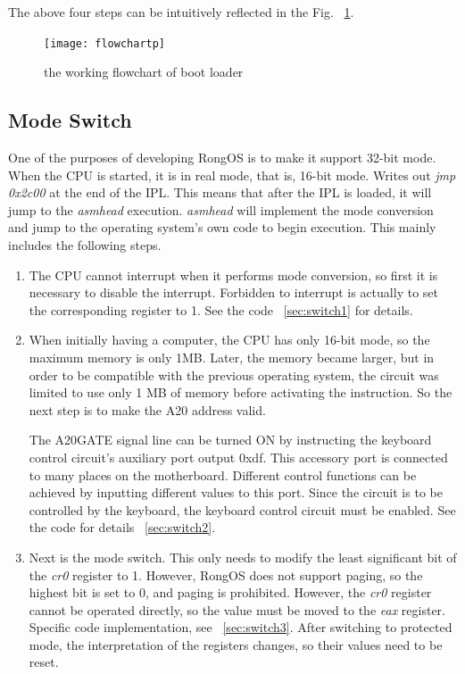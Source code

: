 \documentclass{swfcthesis}
\begin{document}
The above four steps can be intuitively reflected in the Fig. ~\ref{fig:iplflowchart}.
\begin{figure}[!htbp]
  \centering
  \texttt{[image: flowchartp]}
  \caption{the working flowchart of boot loader}
  \label{fig:iplflowchart}
\end{figure}

\subsection{Mode Switch}
\label{sec:mode-switch}

One of the purposes of developing RongOS is to make it support 32-bit mode. When the CPU
is started, it is in real mode, that is, 16-bit mode. Writes out \emph{jmp 0x2c00} at the
end of the IPL. This means that after the IPL is loaded, it will jump to the \emph{asmhead}
execution. \emph{asmhead} will implement the mode conversion and jump to the operating system's
own code to begin execution. This mainly includes the following steps.
\begin{enumerate}
\item The CPU cannot interrupt when it performs mode conversion, so first it is necessary
  to disable the interrupt. Forbidden to interrupt is actually to set the corresponding
  register to 1. See the code ~\ref{sec:switch1} for details.

\item When initially having a computer, the CPU has only 16-bit mode, so the maximum
  memory is only 1MB. Later, the memory became larger, but in order to be compatible with
  the previous operating system, the circuit was limited to use only 1 MB of memory before
  activating the instruction. So the next step is to make the A20 address valid.

  The A20GATE signal line can be turned ON by instructing the keyboard control circuit's
  auxiliary port output 0xdf. This accessory port is connected to many places on the
  motherboard. Different control functions can be achieved by inputting different values
  to this port. Since the circuit is to be controlled by the keyboard, the keyboard
  control circuit must be enabled. See the code for details ~\ref{sec:switch2}.

\item Next is the mode switch. This only needs to modify the least significant bit of the
  \emph{cr0} register to 1. However, RongOS does not support paging, so the highest bit is
  set to 0, and paging is prohibited. However, the \emph{cr0} register cannot be operated
  directly, so the value must be moved to the \emph{eax} register. Specific code
  implementation, see ~\ref{sec:switch3}. After switching to protected mode, the
  interpretation of the registers changes, so their values need to be reset.

\end{enumerate}
\end{document}
